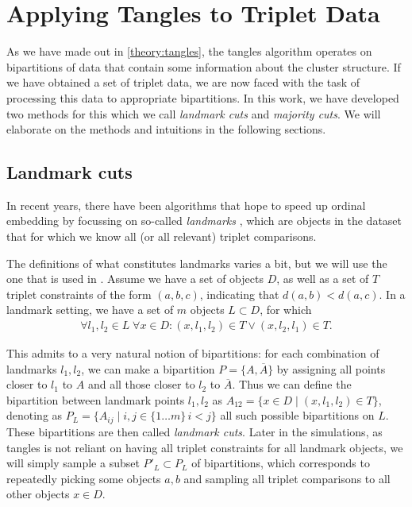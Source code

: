 \chapter{Applying Tangles to Triplet Data}\label{methods}
As we have made out in \autoref{theory:tangles}, the tangles algorithm operates on bipartitions of data that contain some information about the cluster structure.
If we have obtained a set of triplet data, we are now faced with the task of processing this data to appropriate bipartitions. In this work, we have developed two
methods for this which we call \textit{landmark cuts} and \textit{majority cuts}. We will elaborate on the methods and intuitions in the following sections.

\section{Landmark cuts}\label{theory:landmark_cuts}
In recent years, there have been algorithms that hope to speed up ordinal embedding by focussing on so-called \textit{landmarks} \citep{ghoshLandmarkOrdinalEmbedding2019, andertonScalingOrdinalEmbedding2019}, 
which are objects in the dataset that for which we know all (or all relevant) triplet comparisons.

The definitions of what constitutes landmarks varies a bit, but we will use the one that is used in \cite{haghiriComparisonBasedFrameworkPsychophysics2019}.
Assume we have a set of objects $D$, as well as a set of $T$ triplet constraints of the form $(a,b,c)$, indicating that $d(a,b) < d(a,c)$. In a landmark setting, we have a set 
of $m$ objects $L \subset D$, for which 
\begin{align*}
\forall l_1, l_2 \in L \; \forall x \in D: (x, l_1, l_2) \in T \vee (x, l_2, l_1) \in T. 
\end{align*}

This admits to a very natural notion of bipartitions: 
for each combination of landmarks $l_1, l_2$, we can make a bipartition $P = \{A, \overline{A}\}$ by assigning all points closer to $l_1$ to $A$ and all 
those closer to $l_2$ to $\overline{A}$. Thus we can define the bipartition between landmark points $l_1, l_2$ as $A_{12} = \{ x \in D \mid \left( x, l_1, l_2 \right) \in T \}$, 
denoting as $P_L = \{A_{ij}  \mid i, j \in \{1\ldots m\}\, i < j\}$ all such possible bipartitions on $L$. 
These bipartitions are then called \textit{landmark cuts}.
Later in the simulations, as tangles is not reliant on having all triplet constraints for all landmark objects, we will simply sample a subset $P'_{L} \subset P_L$ of bipartitions,
which corresponds to repeatedly picking some objects $a, b$ and sampling all triplet comparisons to all other objects $x \in D$. \\

